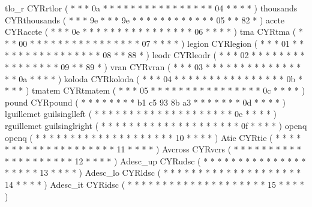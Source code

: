 \makechr tlo_r        CYRrtlor          ( *  *       *  0a  *  *  *  *     *  *  *  *  *     *  *  *  *     *  *  *     04  *  *    *  *   )
%
\makechr thousands    CYRthousands      ( *  *       *  9e  *  *  *  9e    *  *  *  *  *     *  *  *  *     *  *  *     05  *  *    82 *   )
\makechr accte        CYRaccte          ( *  *       *  0e  *  *  *  *     *  *  *  *  *     *  *  *  *     *  *  *     06  *  *    *  *   )
\makechr tma          CYRtma            ( *  *       *  00  *  *  *  *     *  *  *  *  *     *  *  *  *     *  *  *     07  *  *    *  *   )
\makechr legion       CYRlegion         ( *  *       *  01  *  *  *  *     *  *  *  *  *     *  *  *  *     *  *  *     08  *  *    88 *   )
\makechr leodr        CYRleodr          ( *  *       *  02  *  *  *  *     *  *  *  *  *     *  *  *  *     *  *  *     09  *  *    89 *   )
\makechr vran         CYRvran           ( *  *       *  03  *  *  *  *     *  *  *  *  *     *  *  *  *     *  *  *     0a  *  *    *  *   )
\makechr koloda       CYRkoloda         ( *  *       *  04  *  *  *  *     *  *  *  *  *     *  *  *  *     *  *  *     0b  *  *    *  *   )
\makechr tmatem       CYRtmatem         ( *  *       *  05  *  *  *  *     *  *  *  *  *     *  *  *  *     *  *  *     0c  *  *    *  *   )
%
\makechr pound        CYRpound          ( *  *       *  *   *  *  *  *     b1 c5 93 8b a3    *  *  *  *     *  *  *     0d  *  *    *  *   )%
\makechr lguillemet   guilsinglleft     ( *  *       *  *   *  *  *  *     *  *  *  *  *     *  *  *  *     *  *  *     0e  *  *    *  *   )%
\makechr rguillemet   guilsinglright    ( *  *       *  *   *  *  *  *     *  *  *  *  *     *  *  *  *     *  *  *     0f  *  *    *  *   )%
\makechr openq        openq             ( *  *       *  *   *  *  *  *     *  *  *  *  *     *  *  *  *     *  *  *     10  *  *    *  *   )%
\makechr Atie         CYRtie            ( *  *       *  *   *  *  *  *     *  *  *  *  *     *  *  *  *     *  *  *     11  *  *    *  *   )%
\makechr Avcross      CYRvcrs           ( *  *       *  *   *  *  *  *     *  *  *  *  *     *  *  *  *     *  *  *     12  *  *    *  *   )
\makechr Adesc_up     CYRudsc           ( *  *       *  *   *  *  *  *     *  *  *  *  *     *  *  *  *     *  *  *     13  *  *    *  *   )%
\makechr Adesc_lo     CYRldsc           ( *  *       *  *   *  *  *  *     *  *  *  *  *     *  *  *  *     *  *  *     14  *  *    *  *   )
\makechr Adesc_it     CYRidsc           ( *  *       *  *   *  *  *  *     *  *  *  *  *     *  *  *  *     *  *  *     15  *  *    *  *   )
